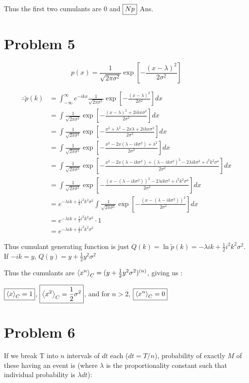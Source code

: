 \documentclass[12pt]{article}
\begin{document}
Thus the first two cumulants are $\boxed{0}$ and $\boxed{Np}\hfill$ Ans.
\section*{Problem 5}
$$p(x) = \frac1{\sqrt{2\pi\sigma^2}}\exp\left[-\frac{(x-\lambda)^2}{2\sigma^2}\right]$$

\begin{align*}
\therefore \tilde{p}(k) &= \int_{-\infty}^{\infty} e^{-ikx} \frac1{\sqrt{2\pi\sigma^2}}\exp\left[-\frac{(x-\lambda)^2}{2\sigma^2}\right] dx\\
&=\int \frac1{\sqrt{2\pi\sigma^2}}\exp\left[-\frac{(x-\lambda)^2 + 2ikx\sigma^2}{2\sigma^2}\right] dx\\
&=\int \frac1{\sqrt{2\pi\sigma^2}}\exp\left[-\frac{x^2 + \lambda^2 - 2x\lambda + 2ikx\sigma^2}{2\sigma^2}\right] dx\\
&=\int \frac1{\sqrt{2\pi\sigma^2}}\exp\left[-\frac{x^2 - 2x(\lambda - ik\sigma^2) + \lambda^2 }{2\sigma^2}\right] dx\\
&=\int \frac1{\sqrt{2\pi\sigma^2}}\exp\left[-\frac{x^2 - 2x(\lambda - ik\sigma^2) + (\lambda - ik\sigma^2)^2 -2\lambda ik\sigma^2 +i^2k^2\sigma^4 }{2\sigma^2}\right] dx\\
&=\int \frac1{\sqrt{2\pi\sigma^2}}\exp\left[-\frac{(x -(\lambda - ik\sigma^2))^2 -2\lambda ik\sigma^2 +i^2k^2\sigma^4 }{2\sigma^2}\right] dx\\
&=e^{-\lambda ik + \frac12 i^2k^2\sigma^2}\int \frac1{\sqrt{2\pi\sigma^2}}\exp\left[-\frac{(x -(\lambda - ik\sigma^2))^2}{2\sigma^2}\right] dx\\
&= e^{-\lambda ik +\frac12 i^2k^2\sigma^2} \cdot 1\\
&= e^{-\lambda ik +\frac12  i^2k^2\sigma^2}
\end{align*}

Thus cumulant generating function is just $Q(k) = \ln \tilde{p}(k) = -\lambda ik + \frac12 i^2k^2\sigma^2$. If $-ik = y$, $Q(y) = y + \frac12 y^2\sigma^2$

Thus the cumulants are $\Braket{x^n}_C = (y + \frac12 y^2\sigma^2)^{(n)}$, giving us :

$\boxed{\Braket{x}_C = 1}$, $\boxed{\Braket{x^2}_C = \frac12\sigma^2}$, and for $n>2$, $\boxed{\Braket{x^n}_C = 0}$

\section*{Problem 6}

If we break T into $n$ intervals of $dt$ each ($dt = T/n$), probability of exactly $M$ of these having an event is (where $\lambda$ is the proportionality constant such that individual probability is $\lambda dt$):
\end{document}
